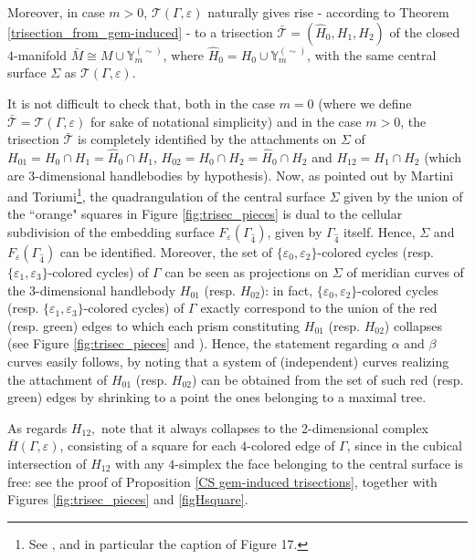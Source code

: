 \documentclass[12pt,a4paper]{article}
\newcommand{\e}{\varepsilon}
\newcommand{\G}{\Gamma}
\begin{document}
Moreover, in case $m>0$, $\mathcal  T(\Gamma, \varepsilon)$ naturally gives rise - according to Theorem \ref{trisection_from_gem-induced} - to a trisection $\bar{\mathcal  T} = (\widehat H_{0},H_{1},H_{2})$ of the closed $4$-manifold $\bar M \cong M \cup {\mathbb Y}_m^{(\sim)}$, where $\widehat H_{0} = H_{0} \cup {\mathbb Y}_m^{(\sim)}$, with the same central surface $\Sigma$ as $\mathcal  T(\Gamma, \varepsilon)$. 

It is not difficult to check that, both in the case $m=0$ (where we define $\bar{\mathcal  T} = \mathcal  T(\Gamma, \varepsilon)$ for sake of notational simplicity) and in the case $m>0$, the trisection $\bar{\mathcal  T}$  is completely identified by the attachments on $\Sigma$ of 
$H_{01}=H_0 \cap H_1=\widehat H_{0} \cap H_{1}$, $H_{02}=H_0 \cap H_2= \widehat H_{0} \cap H_{2}$ and $H_{12}=H_1 \cap H_2$ (which are 3-dimensional handlebodies by hypothesis).  
Now, as pointed out by Martini and Toriumi\footnote{See \cite[Paragraph 4.6]{Martini-Toriumi}, and in particular the caption of Figure 17.}, the quadrangulation of the central surface $\Sigma$ given by the union of the ``orange" squares in Figure \ref{fig:trisec_pieces} is dual to the cellular subdivision of the embedding surface $F_\e(\Gamma_{\hat 4})$, given by $\Gamma_{\hat 4}$ itself. Hence, $\Sigma$ and  $F_\e(\Gamma_{\hat 4})$ can be identified. 
Moreover, the set of $\{\e_0,\e_2\}$-colored cycles (resp. $\{\e_1,\e_3\}$-colored cycles) of $\Gamma$ can be seen as projections on $\Sigma$ of meridian curves of the 3-dimensional handlebody $H_{01}$ (resp. $H_{02}$): in fact, $\{\e_0,\e_2\}$-colored cycles (resp. $\{\e_1,\e_3\}$-colored cycles) of $\Gamma$ exactly correspond to the union of the red (resp. green) edges to which each prism constituting $H_{01}$ (resp. $H_{02}$) collapses (see Figure \ref{fig:trisec_pieces} and  \cite[Paragraph 4.6]{Martini-Toriumi}).    
Hence, the statement regarding $\alpha$ and $\beta$ curves easily follows, by noting that a system of (independent) curves realizing the attachment of 
$H_{01}$ (resp. $H_{02}$) can be obtained from the set of such red (resp. green) edges by shrinking to a point the ones belonging to a maximal tree.    

As regards $H_{12},$ note that it always collapses to the 2-dimensional complex $\bar H(\G, \e)$, consisting of a square for each $4$-colored edge of $\Gamma$, since in the cubical intersection of $H_{12}$ with any $4$-simplex the face belonging to the central surface is free:  see the proof of Proposition \ref{CS gem-induced trisections}, together with Figures \ref{fig:trisec_pieces} and \ref{figHsquare}. 
\end{document}
